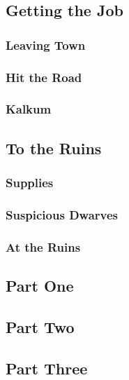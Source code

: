 

\subsection{Getting the Job}


\subsubsection{Leaving Town}


\subsubsection{Hit the Road}


\subsubsection{Kalkum}


\subsection{To the Ruins}


\subsubsection{Supplies}


\subsubsection{Suspicious Dwarves}


\subsubsection{At the Ruins}


\subsection{Part One}


\subsection{Part Two}


\subsection{Part Three}

